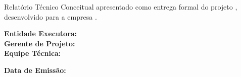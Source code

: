 %
%

\thispagestyle{empty}   %

\vspace*{2cm}

\begin{center}
\begin{minipage}{0.85\textwidth}
    \noindent Relatório Técnico Conceitual apresentado como entrega
    formal do projeto \textbf{\nomeProjeto}, desenvolvido para a
    empresa \textbf{\nomeCliente}.
\end{minipage}
\end{center}

\vfill

\noindent
\begin{minipage}{\textwidth}
    \textbf{Entidade Executora:} \entidadeExecutora \\[0.3cm]
    \textbf{Gerente de Projeto:} \gerenteProjeto \\[0.3cm]
    \textbf{Equipe Técnica:} \equipeTecnica
\end{minipage}

\vspace{1.5cm}

\noindent
\begin{minipage}{\textwidth}
    \textbf{Data de Emissão:} \dataEmissaoDocumento
\end{minipage}

\vspace*{1cm}

\clearpage  %